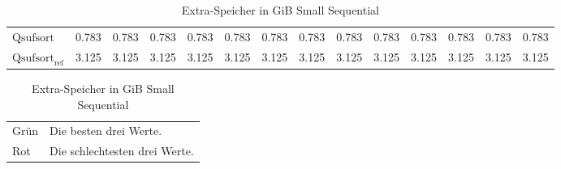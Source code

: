 \begin{table}[h]
{\begin{tabular}{lrrrrrrrrrrrrr}
    $\text{Qsufsort}$ & 0.783 & 0.783 & 0.783 & 0.783 & 0.783 & 0.783 & 0.783 & 0.783 & 0.783 & 0.783 & 0.783 & 0.783 & 0.783 \\
    $\text{Qsufsort}_{\text{ref}}$ & 3.125 & 3.125 & 3.125 & 3.125 & 3.125 & 3.125 & 3.125 & 3.125 & 3.125 & 3.125 & 3.125 & 3.125 & 3.125 \\
\bottomrule
\end{tabular}
}
\caption{Extra-Speicher in GiB Small Sequential}
\label{messung:tab:memory-small-seq-none}
\begin{tabular}{ll}
{\color{green}Grün} & Die besten drei Werte.\\
{\color{red}Rot} & Die schlechtesten drei Werte.\\
\end{tabular}
\end{table}
